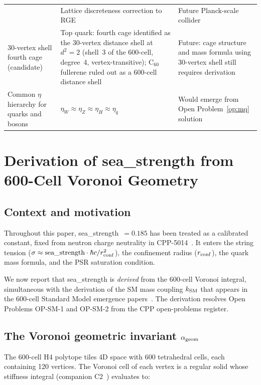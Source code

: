 \documentclass[11pt,a4paper]{article}
\begin{document}
\begin{longtable}{@{}p{5.2cm}p{4cm}p{3.5cm}@{}}
  & Lattice discreteness correction to RGE
  & Future Planck-scale collider \\[4pt]
30-vertex shell fourth cage (candidate)
  & Top quark: fourth cage identified as the 30-vertex distance
    shell at $d^2=2$ (shell~3 of the 600-cell, degree~4, vertex-transitive);
    C$_{60}$ fullerene ruled out as a 600-cell distance shell
  & Future: cage structure and mass formula using 30-vertex
    shell still requires derivation \\[4pt]
Common $\eta$ hierarchy for quarks and bosons
  & $\eta_W \approx \eta_Z \approx \eta_H \approx \eta_q$
  & Would emerge from Open Problem~\ref{op:mq} solution \\
\end{longtable}

\section{Derivation of sea\_strength from 600-Cell Voronoi Geometry}
\label{sec:alpha_geom}

\subsection{Context and motivation}

Throughout this paper, sea\_strength~$= 0.185$ has been treated as
a calibrated constant, fixed from neutron charge neutrality in
CPP-5014~\citep{cpp5014}.  It enters the string tension
($\sigma \approx \text{sea\_strength} \cdot \hbar c / r_{\rm conf}^2$),
the confinement radius ($r_{\rm conf}$), the quark mass formula, and the
PSR saturation condition.

We now report that sea\_strength is \emph{derived} from the
600-cell Voronoi integral, simultaneous with the derivation of the
SM mass coupling $k_{\rm SM}$ that appears in the 600-cell Standard
Model emergence papers~\citep{cpp_sm_paper2}.  The derivation resolves
Open Problems OP-SM-1 and OP-SM-2 from the CPP open-problems
register.

\subsection{The Voronoi geometric invariant $\alpha_{\rm geom}$}

The 600-cell H4 polytope tiles 4D space with 600 tetrahedral cells,
each containing 120 vertices.  The Voronoi cell of each vertex is a
regular solid whose stiffness integral (companion C2~\citep{stiffness_c})
evaluates to:
\end{document}
